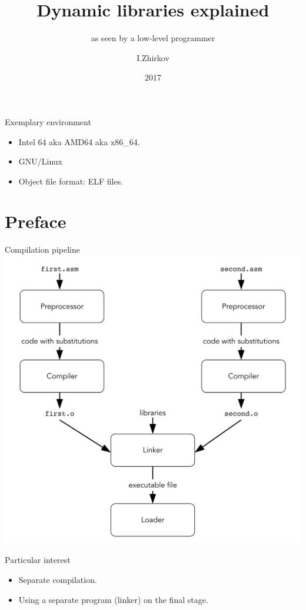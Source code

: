 \documentclass[xcolor={usenames,dvipsnames}]{beamer}
\title{Dynamic libraries explained }
\subtitle{as seen by a low-level programmer}
\author{I.Zhirkov}
\date{2017}
\begin{document}
\begin{frame}
  \titlepage
\end{frame}


\begin{frame}{Exemplary environment}
    \begin{itemize} 
        \item  Intel 64 aka AMD64 aka x86\_64.
        \item  GNU/Linux
        \item  Object file format: ELF files.
\end{itemize} 
\end{frame}


\section{Preface}
\begin{frame}{Compilation pipeline}
    \includegraphics[height=\textheight]{images/compilation.png} 
\end{frame}


\begin{frame}{Particular interest}

\begin{itemize}
    \item  Separate compilation.
    \item  Using a separate program (linker) on the final stage.
\end{itemize}
\end{frame}
\end{document}
